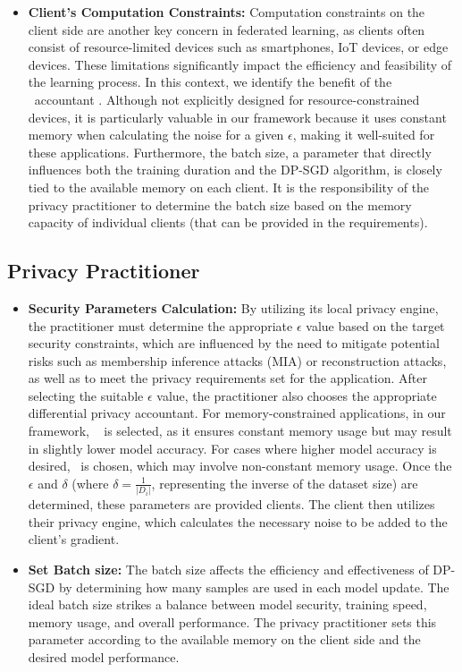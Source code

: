 \begin{itemize}
    \item \textbf{Client's Computation Constraints:} Computation constraints on the client side are another key concern in federated learning, as clients often consist of resource-limited devices such as smartphones, IoT devices, or edge devices. These limitations significantly impact the efficiency and feasibility of the learning process. In this context, we identify the benefit of the \sys~accountant \cite{birrell2024differentially}. Although not explicitly designed for resource-constrained devices, it is particularly valuable in our framework because it uses constant memory when calculating the noise for a given $\epsilon$, making it well-suited for these applications. Furthermore, the batch size, a parameter that directly influences both the training duration and the DP-SGD algorithm, is closely tied to the available memory on each client. It is the responsibility of the privacy practitioner to determine the batch size based on the memory capacity of individual clients (that can be provided in the requirements).  
\end{itemize}
\subsection{Privacy Practitioner}
\begin{itemize}
    \item \textbf{Security Parameters Calculation:}
   By utilizing its local privacy engine, the practitioner must determine the appropriate \(\epsilon\) value based on the target security constraints, which are influenced by the need to mitigate potential risks such as membership inference attacks (MIA) or reconstruction attacks, as well as to meet the privacy requirements set for the application. After selecting the suitable \(\epsilon\) value, the practitioner also chooses the appropriate differential privacy accountant. For memory-constrained applications, in our framework, \sys~ is selected, as it ensures constant memory usage but may result in slightly lower model accuracy. For cases where higher model accuracy is desired, \rdp~is chosen, which may involve non-constant memory usage. Once the \(\epsilon\) and \(\delta\) (where \(\delta = \frac{1}{|D_i|}\), representing the inverse of the dataset size) are determined, these parameters are provided clients. The client then utilizes their privacy engine, which calculates the necessary noise to be added to the client's gradient.
    \item \textbf{Set Batch size:}
    The batch size affects the efficiency and effectiveness of DP-SGD by determining how many samples are used in each model update. The ideal batch size strikes a balance between model security, training speed, memory usage, and overall performance. The privacy practitioner sets this parameter according to the available memory on the client side and the desired model performance.
\end{itemize}
